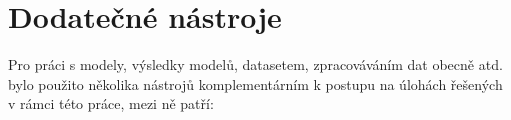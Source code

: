 \section{Dodatečné nástroje}
\label{sec:Chapter53}
Pro práci s modely, výsledky modelů, datasetem, zpracováváním dat obecně atd. bylo použito několika nástrojů komplementárním k postupu na úlohách řešených v rámci této práce, mezi ně patří:

\endinput